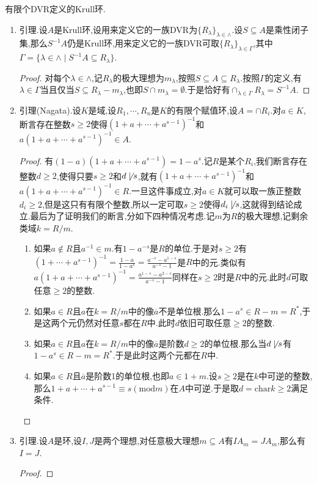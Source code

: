 有限个DVR定义的Krull环.
\begin{enumerate}
	\item 引理.设$A$是Krull环,设用来定义它的一族DVR为$\{R_{\lambda}\}_{\lambda\in\wedge}$.设$S\subseteq A$是乘性闭子集,那么$S^{-1}A$仍是Krull环,用来定义它的一族DVR可取$\{R_{\lambda}\}_{\lambda\in\Gamma}$,其中$\Gamma=\{\lambda\in\wedge\mid S^{-1}A\subseteq R_{\lambda}\}$.
	\begin{proof}
		
		对每个$\lambda\in\wedge$,记$R_{\lambda}$的极大理想为$m_{\lambda}$,按照$S\subseteq A\subseteq R_{\lambda}$.按照$\Gamma$的定义,有$\lambda\in\Gamma$当且仅当$S\subseteq R_{\lambda}-m_{\lambda}$,也即$S\cap m_{\lambda}=\emptyset$.于是恰好有$\cap_{\lambda\in\Gamma}R_{\lambda}=S^{-1}A$.
	\end{proof}
    \item 引理(Nagata).设$K$是域,设$R_1,\cdots,R_n$是$K$的有限个赋值环,设$A=\cap R_i$.对$a\in K$,断言存在整数$s\ge2$使得$(1+a+\cdots+a^{s-1})^{-1}$和$a(1+a+\cdots+a^{s-1})^{-1}\in A$.
    \begin{proof}
    	
    	有$(1-a)(1+a+\cdots+a^{s-1})=1-a^s$.记$R$是某个$R_i$,我们断言存在整数$d\ge2$,使得只要$s\ge2$和$d\not\mid s$,就有$(1+a+\cdots+a^{s-1})^{-1}$和$a(1+a+\cdots+a^{s-1})^{-1}\in R$.一旦这件事成立,对$a\in K$就可以取一族正整数$d_i\ge2$,但是这只有有限个整数,所以一定可取$s\ge2$使得$d_i\not\mid s$,这就得到结论成立.最后为了证明我们的断言,分如下四种情况考虑.记$m$为$R$的极大理想,记剩余类域$k=R/m$.
    	\begin{enumerate}
    		\item 如果$a\not\in R$且$a^{-1}\in m$.有$1-a^{-s}$是$R$的单位.于是对$s\ge2$有$(1+\cdots+a^{s-1})^{-1}=\frac{1-a}{1-a^s}=\frac{a^{-s}-a^{1-s}}{a^{-s}-1}$是$R$中的元.类似有$a(1+a+\cdots+a^{s-1})^{-1}=\frac{a^{1-s}-a^{2-s}}{a^{-s}-1}$同样在$s\ge2$时是$R$中的元.此时$d$可取任意$\ge2$的整数.
    		\item 如果$a\in R$且$a$在$k=R/m$中的像$\overline{a}$不是单位根.那么$1-a^s\in R-m=R^*$,于是这两个元仍然对任意$s$都在$R$中.此时$d$依旧可取任意$\ge2$的整数.
    		\item 如果$a\in R$且$a$在$k=R/m$中的像$\overline{a}$是阶数$d\ge2$的单位根.那么当$d\not\mid s$有$1-a^s\in R-m=R^*$.于是此时这两个元都在$R$中.
    		\item 如果$a\in R$且$\overline{a}$是阶数1的单位根,也即$a\in 1+m$.设$s\ge2$是在$k$中可逆的整数,那么$1+a+\cdots+a^{s-1}\equiv s(\mathrm{mod}m)$在$A$中可逆.于是取$d=\mathrm{char}k\ge2$满足条件.
    	\end{enumerate}
    \end{proof}
    \item 引理.设$A$是环,设$I,J$是两个理想,对任意极大理想$m\subseteq A$有$IA_m=JA_m$,那么有$I=J$.
    \begin{proof}
    	

\end{proof}
\end{enumerate}
